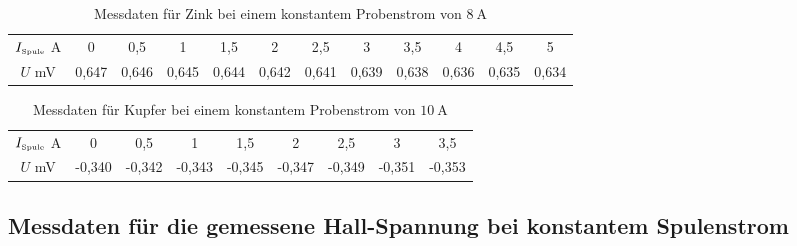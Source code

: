 \begin{table}
 \centering
 \begin{tabular}[width=\textwidth]{S| S[table-format=1.3] S[table-format=1.3] S[table-format=1.3] S[table-format=1.3] S[table-format=1.3] S[table-format=1.3] S[table-format=1.3] S[table-format=1.3] S[table-format=1.3] S[table-format=1.3] S[table-format=1.3]}

     \midrule
      $I_{\text{\tiny{Spule}}}$  \si{\ampere} & 0 & 0,5 & 1 & 1,5 & 2 & 2,5 & 3 & 3,5 & 4 & 4,5 & 5 \\
      $U$  \si{\milli\volt} & 0,647 & 0,646 & 0,645 & 0,644 & 0,642 & 0,641 & 0,639 & 0,638 & 0,636 & 0,635 & 0,634\\
      \bottomrule
\end{tabular}
  \caption{Messdaten für Zink bei einem konstantem Probenstrom von $\SI{8}{\ampere}$}
  \label{tab:Zink_U_H_umgepolt}
\end{table}


\begin{table}
 \centering
 \begin{tabular}[width=\textwidth]{S| S[table-format=2.3] S[table-format=1.3] S[table-format=1.3] S[table-format=1.3] S[table-format=1.3] S[table-format=1.3] S[table-format=1.3] S[table-format=1.3]}

     \midrule
      $I_{\text{\tiny{Spule}}}$  \si{\ampere} & 0 & 0,5 & 1 & 1,5 & 2 & 2,5 & 3 & 3,5\\
      $U$  \si{\milli\volt} & -0,340 & -0,342 & -0,343 & -0,345 & -0,347 & -0,349 & -0,351 & -0,353 \\
      \bottomrule
\end{tabular}
  \caption{Messdaten für Kupfer bei einem konstantem Probenstrom von $\SI{10}{\ampere}$}
  \label{tab:Kupfer_U_H_umgepolt}
\end{table}

\newpage

\subsection{Messdaten für die gemessene Hall-Spannung bei konstantem Spulenstrom}

